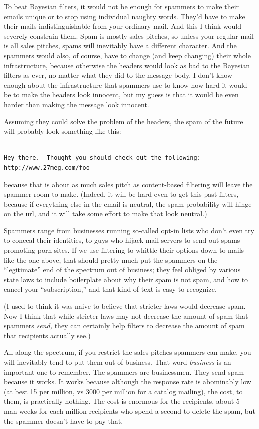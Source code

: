 To beat Bayesian filters, it would not be enough for spammers to make
their emails unique or to stop using individual naughty words. They'd
have to make their mails indistinguishable from your ordinary mail. And
this I think would severely constrain them. Spam is mostly sales
pitches, so unless your regular mail is all sales pitches, spams will
inevitably have a different character. And the spammers would also, of
course, have to change (and keep changing) their whole infrastructure,
because otherwise the headers would look as bad to the Bayesian filters
as ever, no matter what they did to the message body. I don't know
enough about the infrastructure that spammers use to know how hard it
would be to make the headers look innocent, but my guess is that it
would be even harder than making the message look innocent.

Assuming they could solve the problem of the headers, the spam of the
future will probably look something like this:

\begin{verbatim}

Hey there.  Thought you should check out the following:
http://www.27meg.com/foo
\end{verbatim}

because that is about as much sales pitch as content-based filtering
will leave the spammer room to make. (Indeed, it will be hard even to
get this past filters, because if everything else in the email is
neutral, the spam probability will hinge on the url, and it will take
some effort to make that look neutral.)

Spammers range from businesses running so-called opt-in lists who don't
even try to conceal their identities, to guys who hijack mail servers to
send out spams promoting porn sites. If we use filtering to whittle
their options down to mails like the one above, that should pretty much
put the spammers on the ``legitimate'' end of the spectrum out of
business; they feel obliged by various state laws to include boilerplate
about why their spam is not spam, and how to cancel your
``subscription,'' and that kind of text is easy to recognize.

(I used to think it was naive to believe that stricter laws would
decrease spam. Now I think that while stricter laws may not decrease the
amount of spam that spammers \emph{send,} they can certainly help
filters to decrease the amount of spam that recipients actually see.)

All along the spectrum, if you restrict the sales pitches spammers can
make, you will inevitably tend to put them out of business. That word
\emph{business} is an important one to remember. The spammers are
businessmen. They send spam because it works. It works because although
the response rate is abominably low (at best 15 per million, vs 3000 per
million for a catalog mailing), the cost, to them, is practically
nothing. The cost is enormous for the recipients, about 5 man-weeks for
each million recipients who spend a second to delete the spam, but the
spammer doesn't have to pay that.

